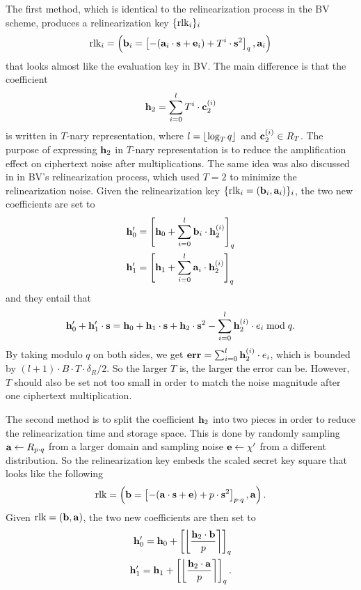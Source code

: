 \documentclass[../main.tex]{subfiles}
\begin{document}
The first method, which is identical to the relinearization process in the BV scheme, produces a relinearization key $\{ \text{rlk}_i \}_{i}$
\begin{align*}
    \text{rlk}_i = \left(\mathbf{b}_{i}=\left[{-(\mathbf{a}_{i} \cdot \mathbf{s} + \mathbf{e}_{i}) + T^{i} \cdot \mathbf{s}^2}\right]_q, \mathbf{a}_{i} \right) 
\end{align*}
that looks almost like the evaluation key in BV. The main difference is that the coefficient \[ \mathbf{h}_2=\sum_{i=0}^l T^i \cdot \mathbf{c}_2^{(i)} \] 
is written in $T$-nary representation, where $l =\left\lfloor{\log_T q}\right\rfloor$ and $\mathbf{c}_2^{(i)} \in R_T$. The purpose of expressing $\mathbf{h}_2$ in $T$-nary representation is to reduce the amplification effect on ciphertext noise after multiplications. %
The same idea was also discussed in  in BV's relinearization process, which used $T=2$ to minimize the relinearization noise. 
Given the relinearization key $\{ \text{rlk}_i = (\mathbf{b}_i, \mathbf{a}_i) \}_i$, the two new coefficients are set to 
\begin{align*}
    \mathbf{h}_0'&=\left[{\mathbf{h}_0+\sum_{i=0}^l \mathbf{b}_i \cdot \mathbf{h}_2^{(i)}}\right]_q\\
    \mathbf{h}_1'&=\left[{\mathbf{h}_1+\sum_{i=0}^l \mathbf{a}_i \cdot \mathbf{h}_2^{(i)}}\right]_q
\end{align*}
and they entail that  
\begin{align*}
    \mathbf{h}_0'+\mathbf{h}_1' \cdot \mathbf{s} = \mathbf{h}_0 + \mathbf{h}_1 \cdot \mathbf{s} + \mathbf{h}_2 \cdot \mathbf{s}^2 - \sum_{i=0}^l \mathbf{h}_2^{(i)} \cdot e_i \bmod q. 
\end{align*}
By taking modulo $q$ on both sides, we get $\mathbf{err}=\sum_{i=0}^l \mathbf{h}_2^{(i)} \cdot e_i$, which is bounded by $(l+1) \cdot B \cdot T \cdot \delta_R/2$. So the larger $T$ is, the larger the error can be. However, $T$ should also be set not too small in order to match the noise magnitude after one ciphertext multiplication. %

The second method is to split the coefficient $\mathbf{h}_2$ into two pieces in order to reduce the relinearization time and storage space. This is done by randomly sampling $\mathbf{a} \leftarrow R_{p \cdot q}$ from a larger domain and sampling noise $\mathbf{e} \leftarrow \chi'$ from a different distribution. So the relinearization key embeds the scaled secret key square that looks like the following
\begin{align*}
    \text{rlk} = \left(\mathbf{b}=\left[{-(\mathbf{a} \cdot \mathbf{s} + \mathbf{e}) + p \cdot \mathbf{s}^2}\right]_{p\cdot q}, \mathbf{a} \right).
\end{align*}
Given $\text{rlk} = (\mathbf{b},\mathbf{a})$, the two new coefficients are then set to %
\begin{align*}
    \mathbf{h}_0' = \mathbf{h}_0 + \left[{\left\lfloor{\frac{\mathbf{h}_2 \cdot \mathbf{b}}{p}}\right\rceil}\right]_q \\ 
    \mathbf{h}_1' = \mathbf{h}_1 + \left[{\left\lfloor{\frac{\mathbf{h}_2 \cdot \mathbf{a}}{p}}\right\rceil}\right]_q.
\end{align*}
\end{document}
